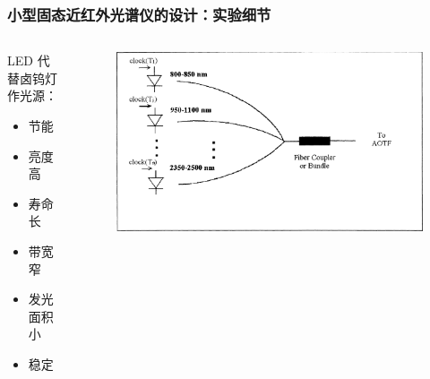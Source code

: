 \begin{frame}[c]
    \frametitle{小型固态近红外光谱仪的设计：实验细节}
    \begin{columns}
        \begin{column}{.4\textwidth}
            LED 代替卤钨灯作光源：
            \begin{itemize}
                \item 节能
                \item 亮度高
                \item 寿命长
                \item 带宽窄
                \item 发光面积小
                \item 稳定
            \end{itemize}
        \end{column}
        \begin{column}{.6\textwidth}
            \begin{figure}[H] %
                \centering %
                \includegraphics[width=1.\textwidth]{figures/Design of a miniature solid state NIR spectrometer_2.png} %
            \end{figure}
        \end{column}
    \end{columns}
\end{frame}